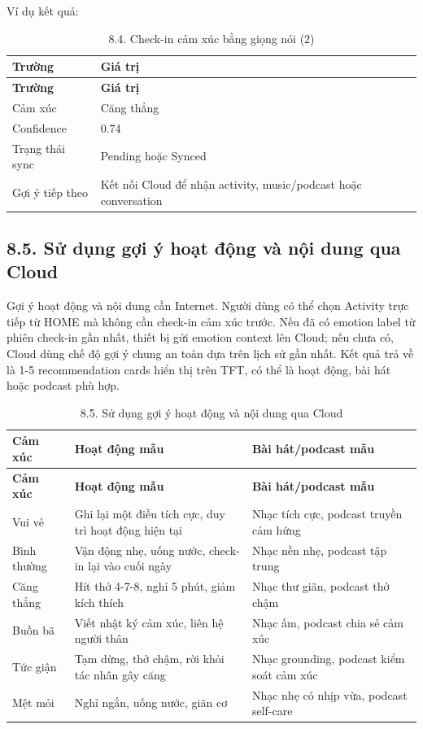 \documentclass[12pt,a4paper]{article}
\begin{document}
Ví dụ kết quả:


\begin{center}
\begin{longtable}{|P{0.30\textwidth}|P{0.62\textwidth}|}
\caption{8.4. Check-in cảm xúc bằng giọng nói (2)}\\
\hline
\textbf{Trường} & \textbf{Giá trị} \\
\hline
\endfirsthead
\hline
\textbf{Trường} & \textbf{Giá trị} \\
\hline
\endhead
Cảm xúc & Căng thẳng \\
\hline
Confidence & 0.74 \\
\hline
Trạng thái sync & Pending hoặc Synced \\
\hline
Gợi ý tiếp theo & Kết nối Cloud để nhận activity, music/podcast hoặc conversation \\
\hline
\end{longtable}
\end{center}

\subsection*{8.5. Sử dụng gợi ý hoạt động và nội dung qua Cloud}

Gợi ý hoạt động và nội dung cần Internet. Người dùng có thể chọn Activity trực tiếp từ HOME mà không cần check-in cảm xúc trước. Nếu đã có emotion label từ phiên check-in gần nhất, thiết bị gửi emotion context lên Cloud; nếu chưa có, Cloud dùng chế độ gợi ý chung an toàn dựa trên lịch sử gần nhất. Kết quả trả về là 1-5 recommendation cards hiển thị trên TFT, có thể là hoạt động, bài hát hoặc podcast phù hợp.


\begin{center}
\begin{longtable}{|P{0.25\textwidth}|P{0.32\textwidth}|P{0.33\textwidth}|}
\caption{8.5. Sử dụng gợi ý hoạt động và nội dung qua Cloud}\\
\hline
\textbf{Cảm xúc} & \textbf{Hoạt động mẫu} & \textbf{Bài hát/podcast mẫu} \\
\hline
\endfirsthead
\hline
\textbf{Cảm xúc} & \textbf{Hoạt động mẫu} & \textbf{Bài hát/podcast mẫu} \\
\hline
\endhead
Vui vẻ & Ghi lại một điều tích cực, duy trì hoạt động hiện tại & Nhạc tích cực, podcast truyền cảm hứng \\
\hline
Bình thường & Vận động nhẹ, uống nước, check-in lại vào cuối ngày & Nhạc nền nhẹ, podcast tập trung \\
\hline
Căng thẳng & Hít thở 4-7-8, nghỉ 5 phút, giảm kích thích & Nhạc thư giãn, podcast thở chậm \\
\hline
Buồn bã & Viết nhật ký cảm xúc, liên hệ người thân & Nhạc ấm, podcast chia sẻ cảm xúc \\
\hline
Tức giận & Tạm dừng, thở chậm, rời khỏi tác nhân gây căng & Nhạc grounding, podcast kiểm soát cảm xúc \\
\hline
Mệt mỏi & Nghỉ ngắn, uống nước, giãn cơ & Nhạc nhẹ có nhịp vừa, podcast self-care \\
\hline
\end{longtable}
\end{center}
\end{document}
